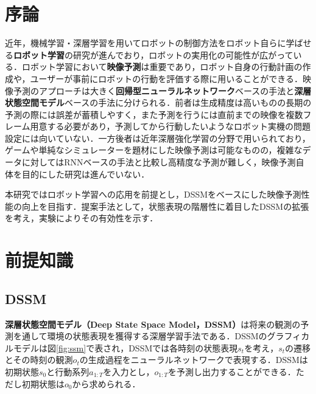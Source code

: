 \documentclass[10pt, twocolumn]{jarticle}
\begin{document}
%


\section{序論}

近年，機械学習・深層学習を用いてロボットの制御方法をロボット自らに学ばせる{\bf ロボット学習}の研究が進んでおり，ロボットの実用化の可能性が広がっている．ロボット学習において{\bf 映像予測}は重要であり，ロボット自身の行動計画の作成や\cite{planet}，ユーザーが事前にロボットの行動を評価する際に用いることができる\cite{ebert2018visual}．映像予測のアプローチは大きく{\bf 回帰型ニューラルネットワーク}ベースの手法と{\bf 深層状態空間モデル}ベースの手法に分けられる．前者は生成精度は高いものの長期の予測の際には誤差が蓄積しやすく，また予測を行うには直前までの映像を複数フレーム用意する必要があり，予測してから行動したいようなロボット実機の問題設定には向いていない．一方後者は近年深層強化学習の分野で用いられており，ゲームや単純なシミュレーターを題材にした映像予測は可能なものの，複雑なデータに対してはRNNベースの手法と比較し高精度な予測が難しく，映像予測自体を目的にした研究は進んでいない．

本研究ではロボット学習への応用を前提とし，DSSMをベースにした映像予測性能の向上を目指す．提案手法として，状態表現の階層性に着目したDSSMの拡張を考え，実験によりその有効性を示す．

\section{前提知識}
\subsection{DSSM}
{\bf 深層状態空間モデル（Deep State Space Model，DSSM）}は将来の観測の予測を通して環境の状態表現を獲得する深層学習手法である\cite{krishnan2015deep}．DSSMのグラフィカルモデルは図\ref{fig:ssm}で表され，DSSMでは各時刻の状態表現$s_t$を考え，$s_t$の遷移とその時刻の観測$o_t$の生成過程をニューラルネットワークで表現する．DSSMは初期状態$s_0$と行動系列$a_{1:T}$を入力とし，$o_{1:T}$を予測し出力することができる．ただし初期状態は$o_0$から求められる．
\end{document}
